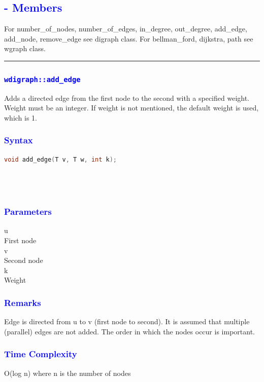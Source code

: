 \documentclass[11pt,a4paper]{article}
\begin{document}
\subsection*{\textcolor{blue}{{\LARGE - Members}}}
For number\_of\_nodes, number\_of\_edges, in\_degree, out\_degree, add\_edge, add\_node, remove\_edge see digraph class.
For bellman\_ford, dijkstra, path see wgraph class.
\\
\rule{17cm}{0.1mm}
\subsubsection*{\textcolor{blue}{\Large\texttt{wdigraph::add\_edge}}}
Adds a directed edge from the first node to the second with a specified weight. Weight must be an integer. If weight is not mentioned, the default weight is used, which is 1.







\subsubsection*{\textcolor{blue}{ \large {Syntax}}}
\begin{lstlisting}[language=C++]
void add_edge(T v, T w, int k);





\end{lstlisting}

\subsubsection*{\textcolor{blue}{ \large {Parameters}}}
u\\
First node\\
v\\
Second node\\
k\\
Weight
\subsubsection*{\textcolor{blue}{ \large {Remarks}}}
Edge is directed from u to v (first node to second). It is assumed that multiple (parallel) edges are not added. The order in which the nodes occur is important.
\subsubsection*{\textcolor{blue}{ \large {Time Complexity}}}
O(log n) where n is the number of nodes
\end{document}
